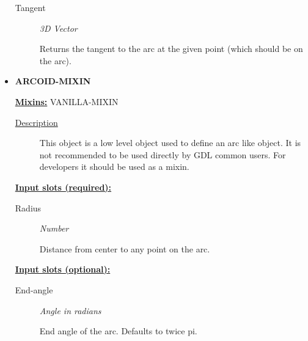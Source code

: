 \documentclass [11pt]{book}
\begin{document}
\begin{itemize}
\begin{description}
\item [Tangent]
\emph{3D Vector}

 Returns the tangent to the arc at the given point (which should be on the arc).




\end{description}







\item {}
\label{prim:arcoid-mixin}
\textbf{ARCOID-MIXIN}


\textbf{
\underline{Mixins:}} VANILLA-MIXIN





\begin{description}

\item [
\underline{Description}]


This object is a low level object used to define 
an arc like object. It is not recommended to be used directly by GDL common users. 
For developers it should be used as a mixin.



\end{description}








\textbf{
\underline{Input slots (required):}}

\begin{description}

\item [Radius]
\emph{Number}

 Distance from center to any point on the arc.




\end{description}






\textbf{
\underline{Input slots (optional):}}

\begin{description}

\item [End-angle]
\emph{Angle in radians}

 End angle of the arc. Defaults to twice pi.





\end{description}
\end{itemize}
\end{document}
